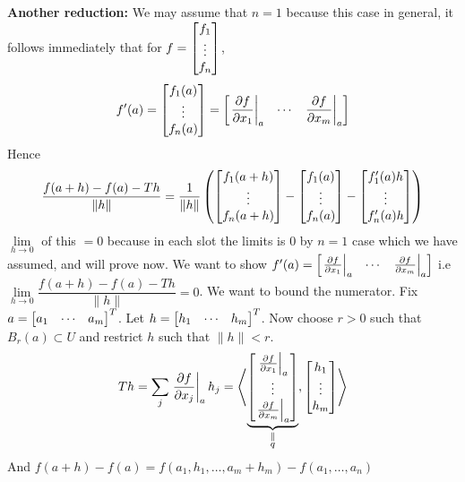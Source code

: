 \begin{myproof}
	\textbf{Another reduction: }We may assume that $n=1$ because this case in general, it follows immediately  that for $f=\left[ \begin{matrix}
				f_1 \\ \vdots\\ f_n
			\end{matrix} \right]$, $$f'(a)=\left[ \begin{matrix}
				f_1(a) \\ \vdots\\ f_n(a)
			\end{matrix} \right]=\left[ \begin{matrix}
				\left.\dfrac{\partial f}{\partial x_1}\right|_a & \cdots & \left.\dfrac{\partial f}{\partial x_m}\right|_a
			\end{matrix} \right]$$Hence $$\dfrac{f(a+h)-f(a)-Th}{\|h\|}=\frac1{\|h\|}\left( \left[ \begin{matrix}
				f_1(a+h) \\ \vdots\\ f_n(a+h)
			\end{matrix} \right]-\left[ \begin{matrix}
				f_1(a) \\ \vdots\\ f_n(a)
			\end{matrix} \right]-\left[ \begin{matrix}
				f_1'(a)h \\ \vdots\\ f_n'(a)h
			\end{matrix} \right] \right)$$$\lim\limits_{h\to 0}$ of this $= 0$ because in each slot the limits is 0 by $n=1$ case which we have assumed, and will prove now.
			\vspace*{2mm}
			We want to show $f'(a)=\left[\begin{matrix}
				\left.\frac{\partial f}{\partial x_1}\right|_a & \cdots & \left.\frac{\partial f}{\partial x_m}\right|_a
			\end{matrix} \right]$ i.e $\lim\limits_{h\to 0}\dfrac{f(a+h)-f(a)-Th}{\|h\|}=0$. We want to bound the numerator. Fix $a=\left[ \begin{matrix}
				a_1 & \cdots & a_m
			\end{matrix} \right]^T$. Let $h=\left[ \begin{matrix}
				h_1 & \cdots & h_m
			\end{matrix} \right]^T$. Now choose $r>0$ such that $B_r(a)\subset U$ and restrict $h$ such that $\|h\|<r$. \[ Th=\sum_j\left.\dfrac{\partial f}{\partial x_j}\right|_ah_j = \left\langle \underbrace{\left[\begin{matrix}
					\left.\frac{\partial f}{\partial x_1}\right|_a \\ \vdots \\ \left.\frac{\partial f}{\partial x_m}\right|_a
				\end{matrix} \right]}_{\substack{\parallel \\ q}}, \left[ \begin{matrix}
				h_1 \\ \vdots \\ h_m
			\end{matrix} \right] \right\rangle \]And $f(a+h)-f(a)=f(a_1,h_1,\dots, a_m+h_m)-f(a_1,\dots, a_n)$


\end{myproof}
